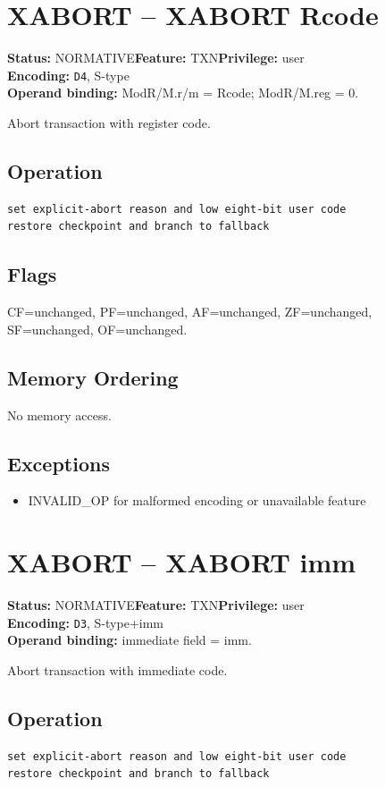 \documentclass[10pt]{article}
\begin{document}
\section{XABORT -- XABORT Rcode}
\textbf{Status:} NORMATIVE\quad \textbf{Feature:} TXN\quad \textbf{Privilege:} user\\
\textbf{Encoding:} \texttt{D4}, S-type\\
\textbf{Operand binding:} ModR/M.r/m = Rcode; ModR/M.reg = 0.

Abort transaction with register code.

\subsection*{Operation}
\begin{lstlisting}
set explicit-abort reason and low eight-bit user code
restore checkpoint and branch to fallback
\end{lstlisting}
\subsection*{Flags}
CF=unchanged, PF=unchanged, AF=unchanged, ZF=unchanged, SF=unchanged, OF=unchanged.
\subsection*{Memory Ordering}
No memory access.
\subsection*{Exceptions}
\begin{itemize}
\item INVALID\_OP for malformed encoding or unavailable feature
\end{itemize}
\clearpage

\section{XABORT -- XABORT imm}
\textbf{Status:} NORMATIVE\quad \textbf{Feature:} TXN\quad \textbf{Privilege:} user\\
\textbf{Encoding:} \texttt{D3}, S-type+imm\\
\textbf{Operand binding:} immediate field = imm.

Abort transaction with immediate code.

\subsection*{Operation}
\begin{lstlisting}
set explicit-abort reason and low eight-bit user code
restore checkpoint and branch to fallback
\end{lstlisting}
\end{document}
